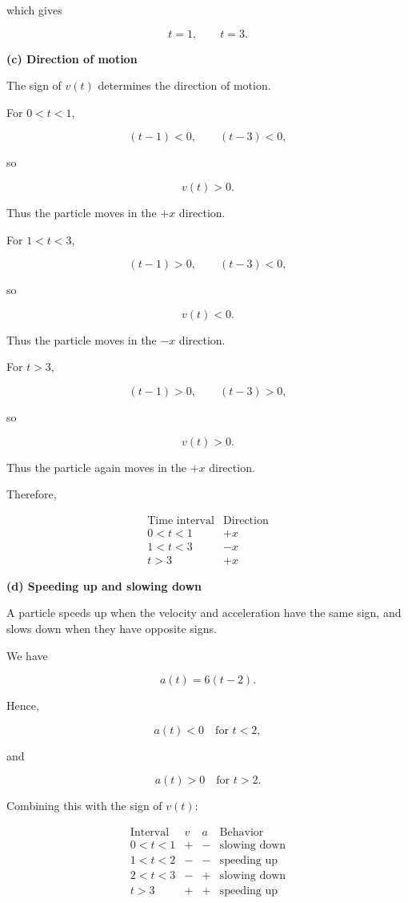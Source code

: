 \documentclass[../main.tex]{subfiles}
\theoremstyle{remark}
\begin{document}
which gives

\[
\boxed{
t=1,\qquad t=3.
}
\]

\textbf{(c) Direction of motion}

The sign of \(v(t)\) determines the direction of motion.

For \(0<t<1\),

\[
(t-1)<0,\qquad (t-3)<0,
\]

so

\[
v(t)>0.
\]

Thus the particle moves in the \(+x\) direction.

For \(1<t<3\),

\[
(t-1)>0,\qquad (t-3)<0,
\]

so

\[
v(t)<0.
\]

Thus the particle moves in the \(-x\) direction.

For \(t>3\),

\[
(t-1)>0,\qquad (t-3)>0,
\]

so

\[
v(t)>0.
\]

Thus the particle again moves in the \(+x\) direction.

Therefore,

\[
\boxed{
\begin{array}{c|c}
\text{Time interval} & \text{Direction} \\ \hline
0<t<1 & +x\\
1<t<3 & -x\\
t>3 & +x
\end{array}
}
\]

\textbf{(d) Speeding up and slowing down}

A particle speeds up when the velocity and acceleration have the same sign, and slows down when they have opposite signs.

We have

\[
a(t)=6(t-2).
\]

Hence,

\[
a(t)<0 \quad \text{for }t<2,
\]

and

\[
a(t)>0 \quad \text{for }t>2.
\]

Combining this with the sign of \(v(t)\):

\[
\begin{array}{c|c|c|c}
\text{Interval} & v & a & \text{Behavior} \\ \hline
0<t<1 & + & - & \text{slowing down}\\
1<t<2 & - & - & \text{speeding up}\\
2<t<3 & - & + & \text{slowing down}\\
t>3 & + & + & \text{speeding up}
\end{array}
\]
\end{document}
